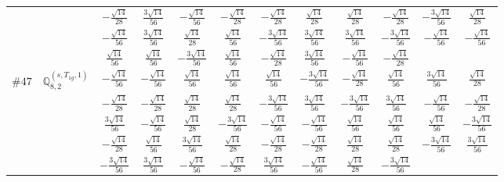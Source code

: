 \documentclass[fleqn,9pt,landscape]{jsarticle}
\begin{document}
\begin{center}
\begin{longtable}{lcccccccccc}
& $ - \frac{\sqrt{14}}{28} $ & $ \frac{3 \sqrt{14}}{56} $ & $ - \frac{\sqrt{14}}{56} $ & $ - \frac{\sqrt{14}}{28} $ & $ - \frac{\sqrt{14}}{28} $ & $ \frac{\sqrt{14}}{28} $ & $ \frac{\sqrt{14}}{28} $ & $ - \frac{\sqrt{14}}{28} $ & $ - \frac{3 \sqrt{14}}{56} $ & $ \frac{\sqrt{14}}{28} $ \\
& $ - \frac{\sqrt{14}}{56} $ & $ \frac{3 \sqrt{14}}{56} $ & $ \frac{\sqrt{14}}{28} $ & $ \frac{\sqrt{14}}{56} $ & $ - \frac{3 \sqrt{14}}{56} $ & $ \frac{3 \sqrt{14}}{56} $ & $ \frac{3 \sqrt{14}}{56} $ & $ - \frac{3 \sqrt{14}}{56} $ & $ - \frac{\sqrt{14}}{56} $ & $ - \frac{\sqrt{14}}{56} $ \\
& $ \frac{\sqrt{14}}{56} $ & $ \frac{\sqrt{14}}{56} $ & $ - \frac{3 \sqrt{14}}{56} $ & $ \frac{\sqrt{14}}{56} $ & $ - \frac{\sqrt{14}}{28} $ & $ \frac{3 \sqrt{14}}{56} $ & $ - \frac{\sqrt{14}}{56} $ & $ - \frac{\sqrt{14}}{28} $ & $  $ & $  $ \\ \hline
$ \#47\quad \mathbb{Q}_{8,2}^{(s,T_{1g},1)} $ & $ - \frac{\sqrt{14}}{56} $ & $ - \frac{\sqrt{14}}{56} $ & $ \frac{\sqrt{14}}{56} $ & $ \frac{\sqrt{14}}{56} $ & $ \frac{\sqrt{14}}{56} $ & $ - \frac{3 \sqrt{14}}{56} $ & $ - \frac{\sqrt{14}}{28} $ & $ \frac{\sqrt{14}}{56} $ & $ \frac{3 \sqrt{14}}{56} $ & $ \frac{\sqrt{14}}{28} $ \\
& $ - \frac{\sqrt{14}}{28} $ & $ - \frac{\sqrt{14}}{28} $ & $ \frac{\sqrt{14}}{28} $ & $ \frac{\sqrt{14}}{28} $ & $ - \frac{3 \sqrt{14}}{56} $ & $ \frac{3 \sqrt{14}}{56} $ & $ - \frac{3 \sqrt{14}}{56} $ & $ \frac{3 \sqrt{14}}{56} $ & $ - \frac{\sqrt{14}}{56} $ & $ - \frac{\sqrt{14}}{28} $ \\
& $ \frac{3 \sqrt{14}}{56} $ & $ - \frac{\sqrt{14}}{56} $ & $ \frac{\sqrt{14}}{28} $ & $ - \frac{3 \sqrt{14}}{56} $ & $ - \frac{\sqrt{14}}{56} $ & $ - \frac{\sqrt{14}}{56} $ & $ \frac{\sqrt{14}}{56} $ & $ \frac{\sqrt{14}}{56} $ & $ \frac{\sqrt{14}}{56} $ & $ - \frac{3 \sqrt{14}}{56} $ \\
& $ - \frac{\sqrt{14}}{28} $ & $ \frac{\sqrt{14}}{56} $ & $ \frac{3 \sqrt{14}}{56} $ & $ \frac{\sqrt{14}}{28} $ & $ - \frac{\sqrt{14}}{28} $ & $ - \frac{\sqrt{14}}{28} $ & $ \frac{\sqrt{14}}{28} $ & $ \frac{\sqrt{14}}{28} $ & $ - \frac{3 \sqrt{14}}{56} $ & $ \frac{3 \sqrt{14}}{56} $ \\
& $ - \frac{3 \sqrt{14}}{56} $ & $ \frac{3 \sqrt{14}}{56} $ & $ - \frac{\sqrt{14}}{56} $ & $ - \frac{\sqrt{14}}{28} $ & $ \frac{3 \sqrt{14}}{56} $ & $ - \frac{\sqrt{14}}{56} $ & $ \frac{\sqrt{14}}{28} $ & $ - \frac{3 \sqrt{14}}{56} $ & $  $ & $  $ \\ \hline

\end{longtable}
\end{center}
\end{document}
